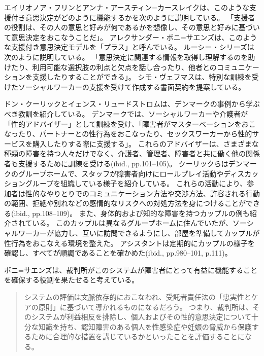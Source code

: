 \documentclass[paper=a4,book,openany]{jlreq} \usepackage{mystyle}
\begin{document}
エイリオノア・フリンとアンナ・アースティン=カースレイクは、このような支援付き意思決定がどのように機能するかを次のように説明している。
「支援者の役割は、その人の意思と好みが何であるかを想像し、その意思と好みに基づいて意思決定をおこなうことだ」\citep[pp.81--104]{flynn14:_legis_person}。
アレクサンダー・ボニ=サエンズは、このような支援付き意思決定モデルを「プラス」と呼んでいる\citep[p.1234]{boni-saenz15:_sexual_incap}。
ルーシー・シリーズは次のように説明している。
「意思決定に関連する情報を取得し理解するのを助けたり、利用可能な選択肢の利点と欠点を話し合ったり、他者とのコミュニケーションを支援したりすることができる」\citep{series15:_relat_auton_legal_capac}。
シモ・ヴェフマスは、特別な訓練を受けたソーシャルワーカーの支援を受けて作成する書面契約を提案している\citep[p.527]{vehmas19:_person_profoun_intel_disab_their_right_sex}。

ドン・クーリックとイェンス・リュードストロムは、デンマークの事例から学ぶべき教訓を紹介している。
デンマークでは、ソーシャルワーカーや介護者が「性的アドバイザー」として訓練を受け、「障害者がマスターベーションをおこなったり、パートナーとの性行為をおこなったり、セックスワーカーから性的サービスを購入したりする際に支援する」\citep[p.18]{kulick15:_lonel_its_oppos}。
これらのアドバイザーは、さまざまな種類の障害を持つ人々だけでなく、介護者、管理者、障害者と共に働く他の関係者も支援するために訓練を受ける(ibid., pp.101--105)。
クーリックらはデンマークのグループホームで、スタッフが障害者向けにロールプレイ活動やディスカッショングループを組織している様子を紹介している。
これらの活動により、参加者は性的なやりとりでのコミュニケーション方法や交渉方法、許容される行動の範囲、拒絶や別れなどの感情的なリスクへの対処方法を身につけることができる(ibid., pp.108--109)。
また、身体的および知的な障害を持つカップルの例も紹介されている。
このカップルは異なるグループホームに住んでいたが、ソーシャルワーカーが協力し、互いに訪問できるようにし、部屋を準備してカップルが性行為をおこなえる環境を整えた。
アシスタントは定期的にカップルの様子を確認し、すべてが順調であることを確かめた(ibid., pp.980--101, p.111)。

ボニ=サエンズは、裁判所がこのシステムが障害者にとって有益に機能することを確保する役割を果たせると考えている。

\begin{quote}
システムの評価は文脈依存的におこなわれ、受託者責任法の「忠実性とケアの原則」に基づいて導かれるものになるだろう。
つまり、裁判所は、そのシステムが利益相反を排除し、個人およびその性的意思決定について十分な知識を持ち、認知障害のある個人を性感染症や妊娠の脅威から保護するために合理的な措置を講じているかといったことを評価することになる。
\citep[p.1234]{boni-saenz15:_sexual_incap}
\end{quote}
\end{document}
